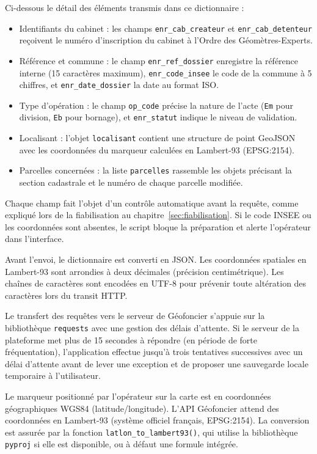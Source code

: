Ci-dessous le détail des éléments transmis dans ce dictionnaire :
\begin{itemize}
  \item Identifiants du cabinet : les champs \texttt{enr\_cab\_createur} et \texttt{enr\_cab\_detenteur} reçoivent le numéro d'inscription du cabinet à l'Ordre des Géomètres-Experts.
  \item Référence et commune : le champ \texttt{enr\_ref\_dossier} enregistre la référence interne (15 caractères maximum), \texttt{enr\_code\_insee} le code de la commune à 5 chiffres, et \texttt{enr\_date\_dossier} la date au format ISO.
  \item Type d'opération : le champ \texttt{op\_code} précise la nature de l'acte (\texttt{Em} pour division, \texttt{Eb} pour bornage), et \texttt{enr\_statut} indique le niveau de validation.
  \item Localisant : l'objet \texttt{localisant} contient une structure de point GeoJSON avec les coordonnées du marqueur calculées en Lambert-93 (EPSG:2154).
  \item Parcelles concernées : la liste \texttt{parcelles} rassemble les objets précisant la section cadastrale et le numéro de chaque parcelle modifiée.
\end{itemize}

Chaque champ fait l'objet d'un contrôle automatique avant la requête, comme expliqué lors de la fiabilisation au chapitre~\ref{sec:fiabilisation}. Si le code INSEE ou les coordonnées sont absentes, le script bloque la préparation et alerte l'opérateur dans l'interface.

Avant l'envoi, le dictionnaire est converti en JSON. Les coordonnées spatiales en Lambert-93 sont arrondies à deux décimales (précision centimétrique). Les chaînes de caractères sont encodées en UTF-8 pour prévenir toute altération des caractères lors du transit HTTP.

Le transfert des requêtes vers le serveur de Géofoncier s'appuie sur la bibliothèque \texttt{requests} avec une gestion des délais d'attente. Si le serveur de la plateforme met plus de 15 secondes à répondre (en période de forte fréquentation), l'application effectue jusqu'à trois tentatives successives avec un délai d'attente avant de lever une exception et de proposer une sauvegarde locale temporaire à l'utilisateur.

Le marqueur positionné par l'opérateur sur la carte est en coordonnées géographiques WGS84 (latitude/longitude). L'API Géofoncier attend des coordonnées en Lambert-93 (système officiel français, EPSG:2154). La conversion est assurée par la fonction \texttt{latlon\_to\_lambert93()}, qui utilise la bibliothèque \texttt{pyproj} si elle est disponible, ou à défaut une formule intégrée.

